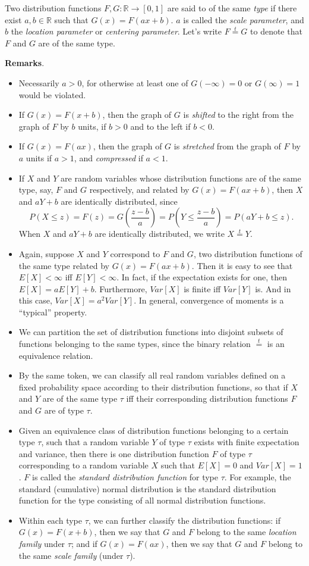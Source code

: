 \documentclass[12pt]{article}
\begin{document}
Two distribution functions $F,G:\mathbb{R}\to [0,1]$ are said to of the same \emph{type} if there exist $a,b\in\mathbb{R}$ such that $G(x)=F(ax+b)$. $a$ is called the \emph{scale parameter}, and $b$ the \emph{location parameter} or \emph{centering parameter}.  Let's write $F\stackrel{t}{=}G$ to denote that $F$ and $G$ are of the same type.

\textbf{Remarks}.
\begin{itemize}
\item Necessarily $a>0$, for otherwise at least one of $G(-\infty)=0$ or $G(\infty)=1$ would be violated.
\item If $G(x)=F(x+b)$, then the graph of $G$ is \emph{shifted} to the right from the graph of $F$ by $b$ units, if $b>0$ and to the left if $b<0$.
\item If $G(x)=F(ax)$, then the graph of $G$ is \emph{stretched} from the graph of $F$ by $a$ units if $a>1$, and \emph{compressed} if $a<1$.
\item If $X$ and $Y$ are random variables whose distribution functions are of the same type, say, $F$ and $G$ respectively, and related by $G(x)=F(ax+b)$, then $X$ and $aY+b$ are identically distributed, since $$P(X\le z)=F(z)=G(\frac{z-b}{a})=P(Y \le \frac{z-b}{a})=P(aY+b \le z).$$  When $X$ and $aY+b$ are identically distributed, we write $X \stackrel{t}{=} Y$.
\item Again, suppose $X$ and $Y$ correspond to $F$ and $G$, two distribution functions of the same type related by $G(x)=F(ax+b)$.  Then it is easy to see that $E[X]<\infty$ iff $E[Y]<\infty$.  In fact, if the expectation exists for one, then $E[X]=aE[Y]+b$.  Furthermore, $Var[X]$ is finite iff $Var[Y]$ is.  And in this case, $Var[X]=a^2Var[Y]$.  In general, convergence of moments is a ``typical'' property.
\item We can partition the set of distribution functions into disjoint subsets of functions belonging to the same types, since the binary relation $\stackrel{t}{=}$ is an equivalence relation.
\item By the same token, we can classify all real random variables defined on a fixed probability space according to their distribution functions, so that if $X$ and $Y$ are of the same type $\tau$ iff their corresponding distribution functions $F$ and $G$ are of type $\tau$.
\item Given an equivalence class of distribution functions belonging to a certain type $\tau$, such that a random variable $Y$ of type $\tau$ exists with finite expectation and variance, then there is one distribution function $F$ of type $\tau$ corresponding to a random variable $X$ such that $E[X]=0$ and $Var[X]=1$.  $F$ is called the \emph{standard distribution function} for type $\tau$.  For example, the standard (cumulative) normal distribution is the standard distribution function for the type consisting of all normal distribution functions.
\item Within each type $\tau$, we can further classify the distribution functions: if $G(x)=F(x+b)$, then we say that $G$ and $F$ belong to the same \emph{location family} under $\tau$; and if $G(x)=F(ax)$, then we say that $G$ and $F$ belong to the same \emph{scale family} (under $\tau$).
\end{itemize}
\end{document}
